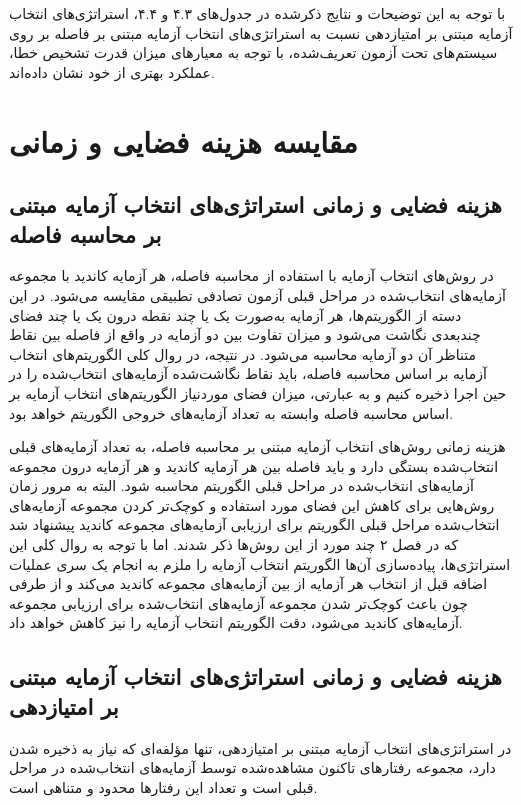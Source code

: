 با توجه به این توضیحات و نتایج ذکرشده در جدول‌های ۴.۳ و ۴.۴، استراتژی‌های انتخاب آزمایه مبتنی بر امتیازدهی نسبت به استراتژی‌های انتخاب آزمایه مبتنی بر فاصله بر روی سیستم‌های تحت آزمون تعریف‌شده، با توجه به معیارهای میزان قدرت تشخیص خطا، عملکرد بهتری از خود نشان داده‌اند.

\section{مقایسه هزینه فضایی و زمانی}

\subsection{هزینه فضایی و زمانی استراتژی‌های انتخاب آزمایه مبتنی بر محاسبه فاصله}

در روش‌های انتخاب آزمایه با استفاده از محاسبه فاصله، هر آزمایه کاندید با مجموعه آزمایه‌های انتخاب‌شده در مراحل قبلی آزمون تصادفی تطبیقی مقایسه می‌شود. در این دسته از الگوریتم‌ها، هر آزمایه به‌صورت یک یا چند نقطه درون یک یا چند فضای چندبعدی نگاشت می‌شود و میزان تفاوت بین دو آزمایه در واقع از فاصله بین نقاط متناظر آن دو آزمایه محاسبه می‌شود. در نتیجه، در روال کلی الگوریتم‌های انتخاب آزمایه بر اساس محاسبه فاصله، باید نقاط نگاشت‌شده آزمایه‌های انتخاب‌شده را در حین اجرا ذخیره کنیم و به عبارتی، میزان فضای موردنیاز الگوریتم‌های انتخاب آزمایه بر اساس محاسبه فاصله وابسته به تعداد آزمایه‌های خروجی الگوریتم خواهد بود.

هزینه زمانی روش‌های انتخاب آزمایه مبتنی بر محاسبه فاصله، به تعداد آزمایه‌های قبلی انتخاب‌شده بستگی دارد و باید فاصله بین هر آزمایه کاندید و هر آزمایه درون مجموعه آزمایه‌های انتخاب‌شده در مراحل قبلی الگوریتم محاسبه شود. البته به مرور زمان روش‌هایی برای کاهش این فضای مورد استفاده و کوچک‌تر کردن مجموعه آزمایه‌های انتخاب‌شده مراحل قبلی الگوریتم برای ارزیابی آزمایه‌های مجموعه کاندید پیشنهاد شد که در فصل ۲ چند مورد از این روش‌ها ذکر شدند. اما با توجه به روال کلی این استراتژی‌ها، پیاده‌سازی آن‌ها الگوریتم انتخاب آزمایه را ملزم به انجام یک سری عملیات اضافه قبل از انتخاب هر آزمایه از بین آزمایه‌های مجموعه کاندید می‌کند و از طرفی چون باعث کوچک‌تر شدن مجموعه آزمایه‌های انتخاب‌شده برای ارزیابی مجموعه آزمایه‌های کاندید می‌شود، دقت الگوریتم انتخاب آزمایه را نیز کاهش خواهد داد.

\subsection{هزینه فضایی و زمانی استراتژی‌های انتخاب آزمایه مبتنی بر امتیازدهی}

در استراتژی‌های انتخاب آزمایه مبتنی بر امتیازدهی، تنها مؤلفه‌ای که نیاز به ذخیره شدن دارد، مجموعه رفتارهای تاکنون مشاهده‌شده توسط آزمایه‌های انتخاب‌شده در مراحل قبلی است و تعداد این رفتارها محدود و متناهی است.

